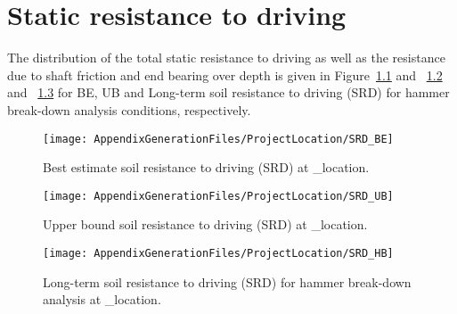 \chapter{Static resistance to driving}\label{sec_3}

The distribution of the total static resistance to driving as well as the resistance due to shaft friction and end bearing over depth is given in Figure~\ref{SRD_BE} and ~\ref{SRD_UB} and ~\ref{SRD_HB} for BE, UB  and Long-term soil resistance to driving (SRD) for hammer break-down analysis conditions, respectively.

\begin{figure}[!htbp]
\texttt{[image: AppendixGenerationFiles/ProjectLocation/SRD\_BE]}
\caption{Best estimate soil resistance to driving (SRD) at {\ID_location}.}
\label{SRD_BE}
\end{figure}

\begin{figure}[!htbp]
\texttt{[image: AppendixGenerationFiles/ProjectLocation/SRD\_UB]}
\caption{Upper bound soil resistance to driving (SRD) at {\ID_location}.}
\label{SRD_UB}
\end{figure}

\begin{figure}[!htbp]
\texttt{[image: AppendixGenerationFiles/ProjectLocation/SRD\_HB]}
\caption{Long-term soil resistance to driving (SRD) for hammer break-down analysis at {\ID_location}.}
\label{SRD_HB}
\end{figure}


\newpage